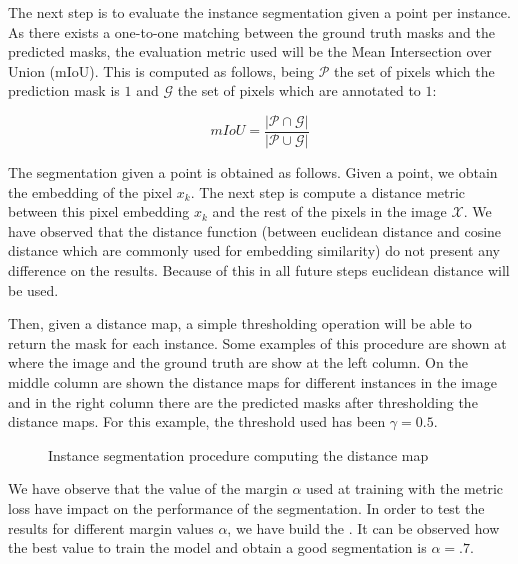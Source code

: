 The next step is to evaluate the instance segmentation given a point per instance. As there exists a one-to-one matching between the ground truth masks and the predicted masks, the evaluation metric used will be the Mean Intersection over Union (mIoU). This is computed as follows, being $\mathcal{P}$ the set of pixels which the prediction mask is $1$ and $\mathcal{G}$ the set of pixels which are annotated to $1$:

\begin{equation}
  mIoU = \frac{|\mathcal{P} \cap \mathcal{G}|}{|\mathcal{P} \cup \mathcal{G}|}
\end{equation}

The segmentation given a point is obtained as follows. Given a point, we obtain the embedding of the pixel $x_k$.
The next step is compute a distance metric between this pixel embedding $x_k$ and the rest of the pixels in the image $\mathcal{X}$.
We have observed that the distance function (between euclidean distance and cosine distance which are commonly used for embedding similarity) do not present any difference on the results.
Because of this in all future steps euclidean distance will be used.

Then, given a distance map, a simple thresholding operation will be able to return the mask for each instance.
Some examples of this procedure are shown at  where the image and the ground truth are show at the left column.
On the middle column are shown the distance maps for different instances in the image and in the right column there are the predicted masks after thresholding the distance maps.
For this example, the threshold used has been $\gamma = 0.5$.

\begin{figure}[h]
  \centering
  \caption{Instance segmentation procedure computing the distance map}
  \label{fig:distance_maps}
\end{figure}

We have observe that the value of the margin $\alpha$ used at training with the metric loss have impact on the performance of the segmentation.
In order to test the results for different margin values $\alpha$, we have build the .
It can be observed how the best value to train the model and obtain a good segmentation is $\alpha = .7$.

